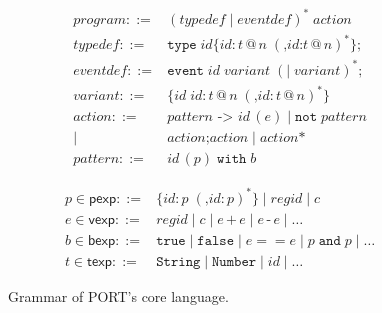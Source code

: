 \begin{figure}[t]
\centering
\scriptsize
\begin{minipage}[t]{.5\linewidth}
\begin{align*}
\mathit{program} ::= {} &  (\mathit{typedef} \mid \mathit{eventdef})^* \; \mathit{action}\\
\mathit{typedef} ::= {} & \mathtt{type}\; \mathit{id} \texttt{\{}\mathit{id} \texttt{:}\, t\, \texttt{@}\, n \; (\texttt{,} \mathit{id}\texttt{:} t\,\texttt{@}\,n)^*\texttt{\};}\\
\mathit{eventdef} ::= {} & \mathtt{event}\; \mathit{id} \; \mathit{variant} \; (\texttt{|}\; \mathit{variant})^*\texttt{;}\\
\mathit{variant} ::= {} & \texttt{\{}\mathit{id}\; \mathit{id}\texttt{:}\, t\,\texttt{@}\,n \; (\texttt{,} \mathit{id}\texttt{:}\, t\,\texttt{@}\,n)^*\texttt{\}}\\
\mathit{action} ::= {} & \mathit{pattern} \texttt{ -> } \mathit{id}\,(e) \mid \mathtt{not} \; \mathit{pattern} \\
\mid {} & \mathit{action} \texttt{;} \mathit{action} \mid \mathit{action}\texttt{*}\\
\mathit{pattern} ::= {} & \mathit{id}\,(p) \;\mathtt{with}\; b
\end{align*}
\end{minipage}%
\begin{minipage}[t]{.5\linewidth}
\begin{align*}
p \in \mathsf{pexp} ::= {} & \texttt{\{} \mathit{id}\texttt{:}\, p \; (\texttt{,} \mathit{id}\texttt{:}\, p)^*\texttt{\}} \mid \mathit{regid} \mid c \\
e \in \mathsf{vexp} ::= {} & \mathit{regid} \mid c \mid e \,\texttt{+}\, e \mid e \,\texttt{-}\, e \mid \dots\\
b \in \mathsf{bexp} ::= {} & \mathtt{true} \mid \mathtt{false} \mid e == e \mid p \;\mathtt{and}\; p \mid \dots\\
t \in \mathsf{texp} ::= {} & \mathtt{String} \mid \mathtt{Number} \mid \mathit{id} \mid \dots
\end{align*}
\end{minipage}
\caption{Grammar of PORT's core language.}
\label{lst:SyntaxGrammar}
\end{figure}

